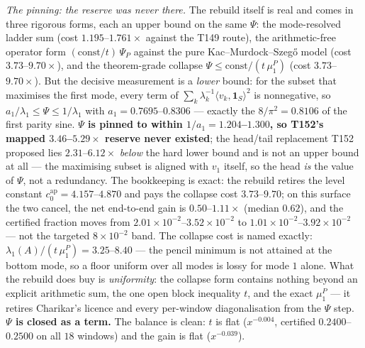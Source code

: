 \documentclass[11pt,a4paper]{article}
\begin{document}
\emph{The pinning: the reserve was never there.} The rebuild itself is real and comes in three
rigorous forms, each an upper bound on the same $\Psi$: the mode-resolved ladder sum (cost
$1.195$--$1.761\times$ against the T149 route), the arithmetic-free operator form
$(\mathrm{const}/t)\,\Psi_P$ against the pure Kac--Murdock--Szeg\H{o} model (cost
$3.73$--$9.70\times$), and the theorem-grade collapse $\Psi\le\mathrm{const}/(t\,\mu^P_1)$
(cost $3.73$--$9.70\times$). But the decisive measurement is a \emph{lower} bound: for the
subset that maximises the first mode, every term of
$\sum_k\lambda_k^{-1}\langle v_k,\mathbf 1_S\rangle^2$ is nonnegative, so
$a_1/\lambda_1\le\Psi\le1/\lambda_1$ with $a_1=0.7695$--$0.8306$ --- exactly the
$8/\pi^2=0.8106$ of the first parity sine. \textbf{$\Psi$ is pinned to within
$1/a_1=1.204$--$1.300$, so T152's mapped $3.46$--$5.29\times$ reserve never existed}; the
head/tail replacement T152 proposed lies $2.31$--$6.12\times$ \emph{below} the hard lower
bound and is not an upper bound at all --- the maximising subset is aligned with $v_1$ itself,
so the head \emph{is} the value of $\Psi$, not a redundancy. The bookkeeping is exact: the
rebuild retires the level constant $c_0^{\mathrm{ap}}=4.157$--$4.870$ and pays the collapse
cost $3.73$--$9.70$; on this surface the two cancel, the net end-to-end gain is
$0.50$--$1.11\times$ (median $0.62$), and the certified fraction moves from
$2.01\times10^{-2}$--$3.52\times10^{-2}$ to $1.01\times10^{-2}$--$3.92\times10^{-2}$ --- not
the targeted $8\times10^{-2}$ band. The collapse cost is named exactly:
$\lambda_1(A)/(t\,\mu^P_1)=3.25$--$8.40$ --- the pencil minimum is not attained at the bottom
mode, so a floor uniform over all modes is lossy for mode $1$ alone. What the rebuild does buy
is \emph{uniformity}: the collapse form contains nothing beyond an explicit arithmetic sum,
the one open block inequality $t$, and the exact $\mu^P_1$ --- it retires Charikar's licence
and every per-window diagonalisation from the $\Psi$ step. \textbf{$\Psi$ is closed as a
term.} The balance is clean: $t$ is flat ($x^{-0.004}$, certified $0.2400$--$0.2500$ on all
$18$ windows) and the gain is flat ($x^{-0.039}$).
\end{document}
